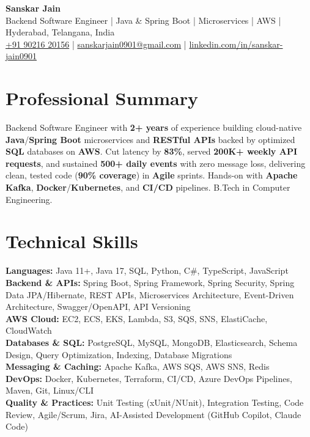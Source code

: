 \documentclass[a4paper,10pt]{article}
\begin{document}
\begin{center}
    {\LARGE \textbf{Sanskar Jain}} \\
    \vspace{2pt}
    Backend Software Engineer \;|\; Java \& Spring Boot \;|\; Microservices \;|\; AWS \;|\; Hyderabad, Telangana, India \\
    \vspace{2pt}
    \href{tel:+919021620156}{+91 90216 20156} \;|\;
    \href{mailto:sanskarjain0901@gmail.com}{sanskarjain0901@gmail.com} \;|\;
    \href{https://www.linkedin.com/in/sanskar-jain0901/}{linkedin.com/in/sanskar-jain0901}
\end{center}

\section*{Professional Summary}
Backend Software Engineer with \textbf{2+ years} of experience building cloud-native \textbf{Java}/\textbf{Spring Boot} microservices and \textbf{RESTful APIs} backed by optimized \textbf{SQL} databases on \textbf{AWS}.
Cut latency by \textbf{83\%}, served \textbf{200K+ weekly API requests}, and sustained \textbf{500+ daily events} with zero message loss, delivering clean, tested code (\textbf{90\% coverage}) in \textbf{Agile} sprints.
Hands-on with \textbf{Apache Kafka}, \textbf{Docker}/\textbf{Kubernetes}, and \textbf{CI/CD} pipelines. B.Tech in Computer Engineering.

\section*{Technical Skills}
\begin{sloppypar}
\noindent
\textbf{Languages:} Java 11+, Java 17, SQL, Python, C\#, TypeScript, JavaScript \\
\textbf{Backend \& APIs:} Spring Boot, Spring Framework, Spring Security, Spring Data JPA/Hibernate, REST APIs, Microservices Architecture, Event-Driven Architecture, Swagger/OpenAPI, API Versioning \\
\textbf{AWS Cloud:} EC2, ECS, EKS, Lambda, S3, SQS, SNS, ElastiCache, CloudWatch \\
\textbf{Databases \& SQL:} PostgreSQL, MySQL, MongoDB, Elasticsearch, Schema Design, Query Optimization, Indexing, Database Migrations \\
\textbf{Messaging \& Caching:} Apache Kafka, AWS SQS, AWS SNS, Redis \\
\textbf{DevOps:} Docker, Kubernetes, Terraform, CI/CD, Azure DevOps Pipelines, Maven, Git, Linux/CLI \\
\textbf{Quality \& Practices:} Unit Testing (xUnit/NUnit), Integration Testing, Code Review, Agile/Scrum, Jira, AI-Assisted Development (GitHub Copilot, Claude Code)
\end{sloppypar}
\end{document}
